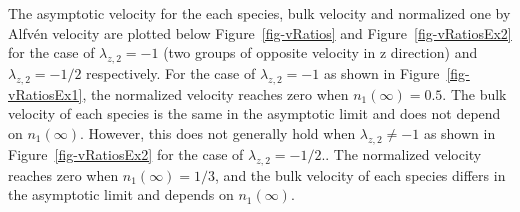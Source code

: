 \documentclass[
  letterpaper,
  DIV=11,
  numbers=noendperiod]{scrartcl}
\begin{document}
\begin{figure}

\begin{minipage}{0.50\linewidth}



\end{minipage}%
%
\begin{minipage}{0.50\linewidth}



\end{minipage}%

\end{figure}%

The asymptotic velocity for the each species, bulk velocity and normalized one by Alfvén velocity are plotted below Figure~\ref{fig-vRatios} and Figure~\ref{fig-vRatiosEx2} for the case of \(\lambda_{z,2} = - 1\) (two groups of opposite velocity in z direction) and \(\lambda_{z,2} = - 1/2\) respectively. For the case of \(\lambda_{z,2} = - 1\) as shown in Figure~\ref{fig-vRatiosEx1}, the normalized velocity reaches zero when \(n_1(∞) = 0.5\). The bulk velocity of each species is the same in the asymptotic limit and does not depend on \(n_1(∞)\). However, this does not generally hold when \(\lambda_{z,2} \neq - 1\) as shown in Figure~\ref{fig-vRatiosEx2} for the case of \(\lambda_{z,2} = - 1/2\).. The normalized velocity reaches zero when \(n_1(∞) = 1/3\), and the bulk velocity of each species differs in the asymptotic limit and depends on \(n_1(∞)\).
\end{document}
